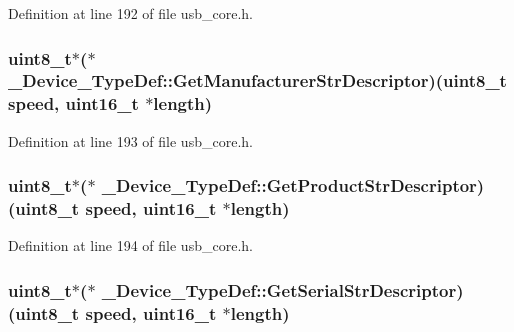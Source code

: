 Definition at line 192 of file usb\-\_\-core.\-h.

\hypertarget{struct___device___type_def_a8e7e7f01fc5e60c5ff4d8c6d63a02ba0}{
\subsubsection[{Get\-Manufacturer\-Str\-Descriptor}]{ {\bf uint8\-\_\-t}$\ast$($\ast$ \-\_\-\-Device\-\_\-\-Type\-Def\-::\-Get\-Manufacturer\-Str\-Descriptor)({\bf uint8\-\_\-t} speed, {\bf uint16\-\_\-t} $\ast${\bf length})}}\label{struct___device___type_def_a8e7e7f01fc5e60c5ff4d8c6d63a02ba0}


Definition at line 193 of file usb\-\_\-core.\-h.

\hypertarget{struct___device___type_def_ac939e7be62a250840d98eb848b649f9c}{
\subsubsection[{Get\-Product\-Str\-Descriptor}]{ {\bf uint8\-\_\-t}$\ast$($\ast$ \-\_\-\-Device\-\_\-\-Type\-Def\-::\-Get\-Product\-Str\-Descriptor)({\bf uint8\-\_\-t} speed, {\bf uint16\-\_\-t} $\ast${\bf length})}}\label{struct___device___type_def_ac939e7be62a250840d98eb848b649f9c}


Definition at line 194 of file usb\-\_\-core.\-h.

\hypertarget{struct___device___type_def_ad56536c92056405c56898cf1b2dc2d06}{
\subsubsection[{Get\-Serial\-Str\-Descriptor}]{ {\bf uint8\-\_\-t}$\ast$($\ast$ \-\_\-\-Device\-\_\-\-Type\-Def\-::\-Get\-Serial\-Str\-Descriptor)({\bf uint8\-\_\-t} speed, {\bf uint16\-\_\-t} $\ast${\bf length})}}\label{struct___device___type_def_ad56536c92056405c56898cf1b2dc2d06}


